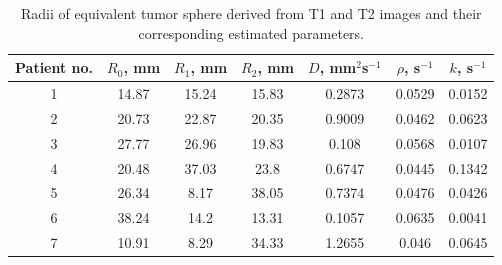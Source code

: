 \documentclass{aims}
\numberwithin{equation}{section}
\begin{document}
\begin{table}[H]
\begin{center}
\caption{\label{tab:Patient-data-para} Radii of equivalent tumor sphere derived
from T1 and T2 images and their corresponding estimated parameters.}
\begin{tabular}{ccccccc} \hline
Patient no. & $R_0$, mm & $R_1$, mm & $R_2$, mm & $D$, mm$^{2} $s$^{-1}$ & $\rho$, s$^{-1}$ & $k$, s$^{-1}$\\ \hline

1 & 14.87 & 15.24 & 15.83 & 0.2873 & 0.0529 & 0.0152 \\
2 & 20.73 & 22.87 & 20.35 & 0.9009 & 0.0462 & 0.0623 \\
3 & 27.77 & 26.96 & 19.83 & 0.108  & 0.0568 & 0.0107 \\
4 & 20.48 & 37.03 & 23.8  & 0.6747 & 0.0445 & 0.1342 \\
5 & 26.34 & 8.17  & 38.05 & 0.7374 & 0.0476 & 0.0426 \\
6 & 38.24 & 14.2  & 13.31 & 0.1057 & 0.0635 & 0.0041 \\
7 & 10.91 & 8.29  & 34.33 & 1.2655 & 0.046  & 0.0645 \\ \hline
\end{tabular}
\end{center}
\end{table}
\end{document}
